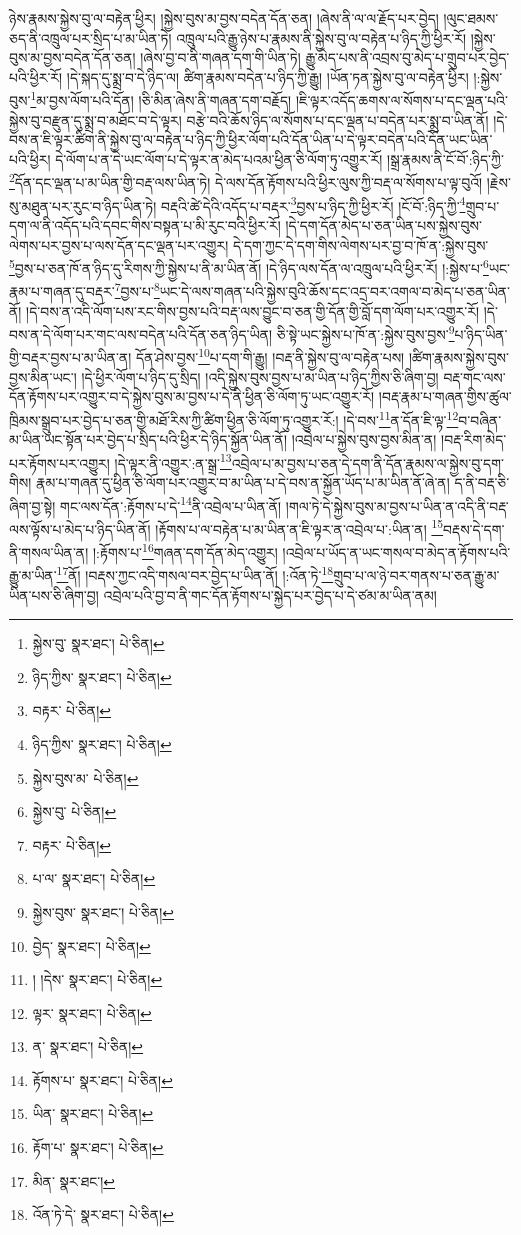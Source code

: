 ཉེས་རྣམས་སྐྱེས་བུ་ལ་བརྟེན་ཕྱིར། །སྐྱེས་བུས་མ་བྱས་བདེན་དོན་ཅན། །ཞེས་ནི་ལ་ལ་རྗོད་པར་བྱེད། །ལུང་ཐམས་ཅད་ནི་འཁྲུལ་པར་སྲིད་པ་མ་ཡིན་ཏེ། འཁྲུལ་པའི་རྒྱུ་ཉེས་པ་རྣམས་ནི་སྐྱེས་བུ་ལ་བརྟེན་པ་ཉིད་ཀྱི་ཕྱིར་རོ། །སྐྱེས་བུས་མ་བྱས་བདེན་དོན་ཅན། །ཞེས་བྱ་བ་ནི་གཞན་དག་གི་ཡིན་ཏེ། རྒྱུ་མེད་པས་ནི་འབྲས་བུ་མེད་པ་གྲུབ་པར་བྱེད་པའི་ཕྱིར་རོ། །དེ་སྐད་དུ་སྨྲ་བ་དེ་ཉིད་ལ། ཚིག་རྣམས་བདེན་པ་ཉིད་ཀྱི་རྒྱུ། །ཡོན་ཏན་སྐྱེས་བུ་ལ་བརྟེན་ཕྱིར། །:སྐྱེས་བུས་\footnote{སྐྱེས་བུ་  སྣར་ཐང་།  པེ་ཅིན། }མ་བྱས་ལོག་པའི་དོན། །ཅི་མིན་ཞེས་ནི་གཞན་དག་བརྗོད། །ཇི་ལྟར་འདོད་ཆགས་ལ་སོགས་པ་དང་ལྡན་པའི་སྐྱེས་བུ་བརྫུན་དུ་སྨྲ་བ་མཐོང་བ་དེ་ལྟར། བརྩེ་བའི་ཆོས་ཉིད་ལ་སོགས་པ་དང་ལྡན་པ་བདེན་པར་སྨྲ་བ་ཡིན་ནོ། །དེ་བས་ན་ཇི་ལྟར་ཚིག་ནི་སྐྱེས་བུ་ལ་བརྟེན་པ་ཉིད་ཀྱི་ཕྱིར་ལོག་པའི་དོན་ཡིན་པ་དེ་ལྟར་བདེན་པའི་དོན་ཡང་ཡིན་པའི་ཕྱིར། དེ་ལོག་པ་ན་དེ་ཡང་ལོག་པ་དེ་ལྟར་ན་མེད་པའམ་ཕྱིན་ཅི་ལོག་ཏུ་འགྱུར་རོ། །སྒྲ་རྣམས་ནི་ངོ་བོ་:ཉིད་ཀྱི་\footnote{ཉིད་ཀྱིས་  སྣར་ཐང་།  པེ་ཅིན། }དོན་དང་ལྡན་པ་མ་ཡིན་གྱི་བརྡ་ལས་ཡིན་ཏེ། དེ་ལས་དོན་རྟོགས་པའི་ཕྱིར་ལུས་ཀྱི་བརྡ་ལ་སོགས་པ་ལྟ་བུའོ། །རྗེས་སུ་མཐུན་པར་རུང་བ་ཉིད་ཡིན་ཏེ། བརྡའི་ཚེ་དེའི་འདོད་པ་བརྡར་\footnote{བརྟར་  པེ་ཅིན། }བྱས་པ་ཉིད་ཀྱི་ཕྱིར་རོ། །ངོ་བོ་:ཉིད་ཀྱི་\footnote{ཉིད་ཀྱིས་  སྣར་ཐང་།  པེ་ཅིན། }གྲུབ་པ་དག་ལ་ནི་འདོད་པའི་དབང་གིས་བསྟན་པ་མི་རུང་བའི་ཕྱིར་རོ། །དེ་དག་དོན་མེད་པ་ཅན་ཡིན་པས་སྐྱེས་བུས་ལེགས་པར་བྱས་པ་ལས་དོན་དང་ལྡན་པར་འགྱུར། དེ་དག་ཀྱང་དེ་དག་གིས་ལེགས་པར་བྱ་བ་ཁོ་ན་:སྐྱེས་བུས་\footnote{སྐྱེས་བུས་མ་  པེ་ཅིན། }བྱས་པ་ཅན་ཁོ་ན་ཉིད་དུ་རིགས་ཀྱི་སྐྱེས་པ་ནི་མ་ཡིན་ནོ། །དེ་ཉིད་ལས་དོན་ལ་འཁྲུལ་པའི་ཕྱིར་རོ། །:སྐྱེས་པ་\footnote{སྐྱེས་བུ་  པེ་ཅིན། }ཡང་རྣམ་པ་གཞན་དུ་བརྡར་\footnote{བརྟར་  པེ་ཅིན། }བྱས་པ་\footnote{པ་ལ་  སྣར་ཐང་།  པེ་ཅིན། }ཡང་དེ་ལས་གཞན་པའི་སྐྱེས་བུའི་ཆོས་དང་འདྲ་བར་འགལ་བ་མེད་པ་ཅན་ཡིན་ནོ། །དེ་བས་ན་འདི་ལོག་པས་རང་གིས་བྱས་པའི་བརྡ་ལས་བྱུང་བ་ཅན་གྱི་དོན་གྱི་བློ་དག་ལོག་པར་འགྱུར་རོ། །དེ་བས་ན་དེ་ལོག་པར་གང་ལས་བདེན་པའི་དོན་ཅན་ཉིད་ཡིན། ཅི་སྟེ་ཡང་སྐྱེས་པ་ཁོ་ན་:སྐྱེས་བུས་བྱས་\footnote{སྐྱེས་བུས་  སྣར་ཐང་།  པེ་ཅིན། }པ་ཉིད་ཡིན་གྱི་བརྡར་བྱས་པ་མ་ཡིན་ན། དོན་ཤེས་བྱས་\footnote{བྱེད་  སྣར་ཐང་།  པེ་ཅིན། }པ་དག་གི་རྒྱུ། །བརྡ་ནི་སྐྱེས་བུ་ལ་བརྟེན་པས། །ཚིག་རྣམས་སྐྱེས་བུས་བྱས་མིན་ཡང་། །དེ་ཕྱིར་ལོག་པ་ཉིད་དུ་སྲིད། །འདི་སྐྱེས་བུས་བྱས་པ་མ་ཡིན་པ་ཉིད་ཀྱིས་ཅི་ཞིག་བྱ། བརྡ་གང་ལས་དོན་རྟོགས་པར་འགྱུར་བ་དེ་སྐྱེས་བུས་མ་བྱས་པ་དེ་ནི་ཕྱིན་ཅི་ལོག་ཏུ་ཡང་འགྱུར་རོ། །བརྡ་རྣམ་པ་གཞན་གྱིས་ཚུལ་ཁྲིམས་སྒྲུབ་པར་བྱེད་པ་ཅན་གྱི་མཐོ་རིས་ཀྱི་ཚིག་ཕྱིན་ཅི་ལོག་ཏུ་འགྱུར་རོ:། །དེ་བས་\footnote{། །དེས་  སྣར་ཐང་།  པེ་ཅིན། }ན་དོན་ཇི་ལྟ་\footnote{ལྟར་  སྣར་ཐང་།  པེ་ཅིན། }བ་བཞིན་མ་ཡིན་ཡང་སྟོན་པར་བྱེད་པ་སྲིད་པའི་ཕྱིར་དེ་ཉིད་སྐྱོན་ཡིན་ནོ། །འབྲེལ་པ་སྐྱེས་བུས་བྱས་མིན་ན། །བརྡ་རིག་མེད་པར་རྟོགས་པར་འགྱུར། །དེ་ལྟར་ནི་འགྱུར་:ན་སྒྲ་\footnote{ན་  སྣར་ཐང་།  པེ་ཅིན། }འབྲེལ་པ་མ་བྱས་པ་ཅན་དེ་དག་ནི་དོན་རྣམས་ལ་སྐྱེས་བུ་དག་གིས། རྣམ་པ་གཞན་དུ་ཕྱིན་ཅི་ལོག་པར་འགྱུར་བ་མ་ཡིན་པ་དེ་བས་ན་སྐྱོན་ཡོད་པ་མ་ཡིན་ནོ་ཞེ་ན། ད་ནི་བརྡ་ཅི་ཞིག་བྱ་སྟེ། གང་ལས་དོན་:རྟོགས་པ་དེ་\footnote{རྟོགས་པ་  སྣར་ཐང་།  པེ་ཅིན། }ནི་འབྲེལ་པ་ཡིན་ནོ། །གལ་ཏེ་དེ་སྐྱེས་བུས་མ་བྱས་པ་ཡིན་ན་འདི་ནི་བརྡ་ལས་ལྟོས་པ་མེད་པ་ཉིད་ཡིན་ནོ། །རྟོགས་པ་ལ་བརྟེན་པ་མ་ཡིན་ན་ཇི་ལྟར་ན་འབྲེལ་པ་:ཡིན་ན། \footnote{ཡིན་  སྣར་ཐང་།  པེ་ཅིན། }བརྡས་དེ་དག་ནི་གསལ་ཡིན་ན། །:རྟོགས་པ་\footnote{རྟོག་པ་  སྣར་ཐང་།  པེ་ཅིན། }གཞན་དག་དོན་མེད་འགྱུར། །འབྲེལ་པ་ཡོད་ན་ཡང་གསལ་བ་མེད་ན་རྟོགས་པའི་རྒྱུ་མ་ཡིན་\footnote{མིན་  སྣར་ཐང་། }ནོ། །བརྡས་ཀྱང་འདི་གསལ་བར་བྱེད་པ་ཡིན་ནོ། །:འོན་ཏེ་\footnote{འོན་ཏེ་དེ་  སྣར་ཐང་།  པེ་ཅིན། }གྲུབ་པ་ལ་ཉེ་བར་གནས་པ་ཅན་རྒྱུ་མ་ཡིན་པས་ཅི་ཞིག་བྱ། འབྲེལ་པའི་བྱ་བ་ནི་གང་དོན་རྟོགས་པ་སྐྱེད་པར་བྱེད་པ་དེ་ཙམ་མ་ཡིན་ནམ། 